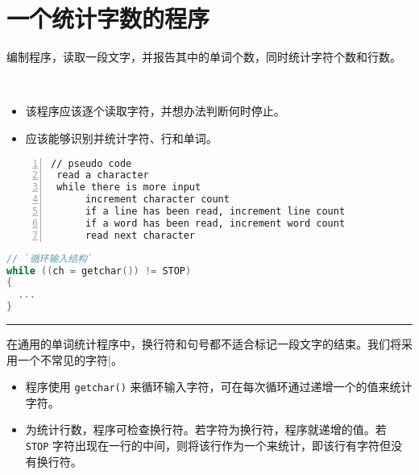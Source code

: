 \section{一个统计字数的程序}

\begin{frame}[fragile]\ft{\secname}
  \begin{free}[例]{}
    编制程序，读取一段文字，并报告其中的单词个数，同时统计字符个数和行数。
  \end{free}　\pause 
  \begin{free}[要求]{}
  \begin{itemize}
  \item 该程序应该逐个读取字符，并想办法判断何时停止。\\[0.2in]
  \item 应该能够识别并统计字符、行和单词。
  \end{itemize}  
  \end{free}
\end{frame}

\begin{frame}[fragile]\ft{\secname}
\begin{lstlisting}[frame=single,numbers=left]
// pseudo code
 read a character
 while there is more input
      increment character count
      if a line has been read, increment line count
      if a word has been read, increment word count
      read next character
\end{lstlisting}
\end{frame}

\begin{frame}[fragile]\ft{\secname}
\begin{lstlisting}[language=c]
// `循环输入结构`
while ((ch = getchar()) != STOP)
{
  ...
}
\end{lstlisting}
\rule{\textwidth}{1mm}\vspace{.5mm}\pause 

在通用的单词统计程序中，换行符和句号都不适合标记一段文字的结束。我们将采用一个不常见的字符{\tf |}。
\end{frame}

\begin{frame}[fragile]\ft{\secname}
\begin{itemize}
\item 程序使用 \lstinline|getchar()| 来循环输入字符，可在每次循环通过递增一个的值来统计字符。\\[0.15in]
\item 为统计行数，程序可检查换行符。若字符为换行符，程序就递增的值。若 \lstinline|STOP| 字符出现在一行的中间，则将该行作为一个来统计，即该行有字符但没有换行符。
\end{itemize}
\end{frame}

